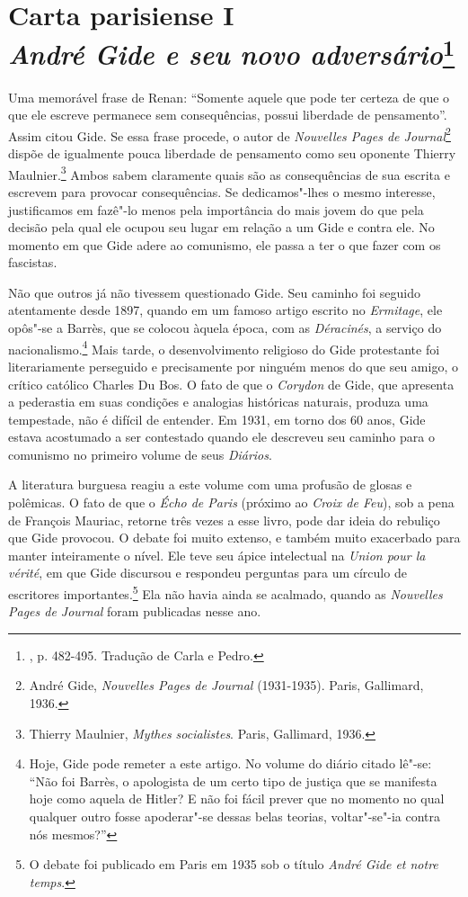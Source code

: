 \chapter{Carta parisiense I\\ \emph{André Gide e seu novo adversário}\footnote[*]{
  , p. 482-495. Tradução de Carla e Pedro.}}


Uma memorável frase de Renan: ``Somente aquele que pode ter certeza de
que o que ele escreve permanece sem consequências, possui liberdade de
pensamento''. Assim citou Gide. Se essa frase procede, o autor de
\emph{Nouvelles Pages de Journal}\footnote{André Gide,
  \emph{Nouvelles Pages de Journal} (1931-1935). Paris, Gallimard, 1936. \versal{[N. A.]}}
dispõe de igualmente pouca liberdade de pensamento como seu oponente
Thierry Maulnier.\footnote{Thierry Maulnier, \emph{Mythes
  socialistes}. Paris, Gallimard, 1936. \versal{[N. A.]}} Ambos sabem claramente quais
são as consequências de sua escrita e escrevem para provocar
consequências. Se dedicamos"-lhes o mesmo interesse, justificamos em
fazê"-lo menos pela importância do mais jovem do que pela decisão pela
qual ele ocupou seu lugar em relação a um Gide e contra ele. No
momento em que Gide adere ao comunismo, ele passa a ter o que fazer com
os fascistas.

Não que outros já não tivessem questionado Gide. Seu caminho foi seguido
atentamente desde 1897, quando em um famoso artigo escrito no
\emph{Ermitage}, ele opôs"-se a Barrès, que se colocou àquela época, com
as \emph{Déracinés}, a serviço do nacionalismo.\footnote{Hoje, Gide
  pode remeter a este artigo. No volume do diário citado lê"-se: ``Não
  foi Barrès, o apologista de um certo tipo de justiça que se manifesta
  hoje como aquela de Hitler? E não foi fácil prever que no momento no
  qual qualquer outro fosse apoderar"-se dessas belas teorias,
  voltar"-se"-ia contra nós mesmos?'' \versal{[N. A.]}} Mais tarde, o desenvolvimento
religioso do Gide protestante foi literariamente perseguido e
precisamente por ninguém menos do que seu amigo, o crítico católico
Charles Du Bos. O fato de que o \emph{Corydon} de Gide, que apresenta a pederastia
em suas condições e analogias históricas naturais, produza uma
tempestade, não é difícil de entender. Em 1931, em torno dos 60 anos,
Gide estava acostumado a ser contestado quando ele descreveu seu caminho
para o comunismo no primeiro volume de seus \emph{Diários}.

A literatura burguesa reagiu a este volume com uma profusão de glosas e
polêmicas. O fato de que o \emph{Écho de Paris} (próximo ao \emph{Croix de Feu}), sob a pena de François Mauriac, retorne três vezes a esse
livro, pode dar ideia do rebuliço que Gide provocou. O debate foi muito
extenso, e também muito exacerbado para manter inteiramente o nível. Ele
teve seu ápice intelectual na \emph{Union pour la vérité}, em que Gide
discursou e respondeu perguntas para um círculo de escritores
importantes.\footnote{O debate foi publicado em Paris em 1935 sob o
  título \emph{André Gide et notre temps}. \versal{[N. A.]}} Ela não havia ainda se
acalmado, quando as \emph{Nouvelles Pages de Journal} foram publicadas
nesse ano.

